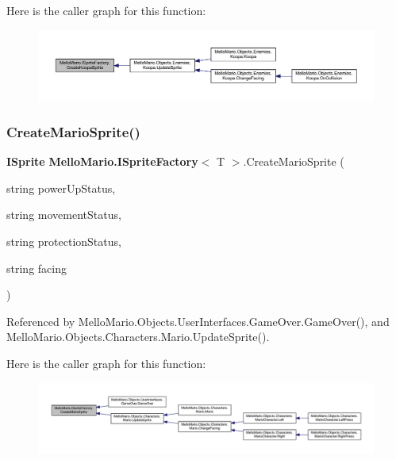 Here is the caller graph for this function\+:
\nopagebreak
\begin{figure}[H]
\begin{center}
\leavevmode
\includegraphics[width=350pt]{interfaceMelloMario_1_1ISpriteFactory_aac5bcc36a5f7b692b4f6cbbd0d261240_icgraph}
\end{center}
\end{figure}
\mbox{\label{interfaceMelloMario_1_1ISpriteFactory_a204f922bd360ad83cdaf563e60e969bc}} 
\subsubsection{Create\+Mario\+Sprite()}
{\footnotesize\ttfamily \textbf{ I\+Sprite} \textbf{ Mello\+Mario.\+I\+Sprite\+Factory}$<$ T $>$.Create\+Mario\+Sprite (\begin{DoxyParamCaption}\item[{string}]{power\+Up\+Status,  }\item[{string}]{movement\+Status,  }\item[{string}]{protection\+Status,  }\item[{string}]{facing }\end{DoxyParamCaption})}



Referenced by Mello\+Mario.\+Objects.\+User\+Interfaces.\+Game\+Over.\+Game\+Over(), and Mello\+Mario.\+Objects.\+Characters.\+Mario.\+Update\+Sprite().

Here is the caller graph for this function\+:
\nopagebreak
\begin{figure}[H]
\begin{center}
\leavevmode
\includegraphics[width=350pt]{interfaceMelloMario_1_1ISpriteFactory_a204f922bd360ad83cdaf563e60e969bc_icgraph}
\end{center}
\end{figure}
\mbox{\label{interfaceMelloMario_1_1ISpriteFactory_af0610c0c0204b652f13464f4ffac6cbf}} 
